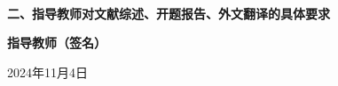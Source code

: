 \pagestyle{Require}
\stutitle \\
{\bfseries 二、指导教师对文献综述、开题报告、外文翻译的具体要求}



\vfill
{\hfill {\bfseries 指导教师（签名）\underline{\makebox[3cm]{}}}}\par
\hfill {  2024年11月4日}